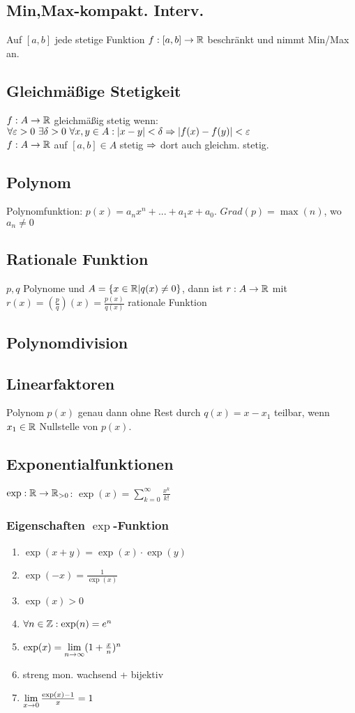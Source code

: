 \subsection*{Min,Max-kompakt. Interv.}
Auf $[a, b]$ jede stetige Funktion $f: [a, b] \rightarrow \mathbb R$ beschränkt und nimmt Min/Max an.
\subsection*{Gleichmäßige Stetigkeit}
$f: A \rightarrow \mathbb R$ gleichmäßig stetig wenn: $\forall \varepsilon > 0 \ \exists \delta > 0 \ \forall x, y \in A: |x - y| < \delta \Rightarrow |f(x) - f(y)| < \varepsilon$\\
$f: A \rightarrow \mathbb R$ auf $[a, b] \in A$ stetig $\Rightarrow$ dort auch gleichm. stetig.
\subsection*{Polynom}
Polynomfunktion: $p(x) = a_n x^n + ... + a_1 x + a_0$. $Grad(p) = \max(n)$, wo $a_n \neq 0$
\subsection*{Rationale Funktion}
$p, q$ Polynome und $A = \{x \in \mathbb R| q(x) \neq 0\}$, dann ist $r: A \rightarrow \mathbb R$ mit $r(x) = \left(\frac{p}{q}\right)(x) = \frac{p(x)}{q(x)}$ rationale Funktion
\subsection*{Polynomdivision}
\subsection*{Linearfaktoren}
Polynom $p(x)$ genau dann ohne Rest durch $q(x) = x - x_1$ teilbar, wenn $x_1 \in \mathbb R$ Nullstelle von $p(x)$.
\subsection*{Exponentialfunktionen}
$\exp: \mathbb R \rightarrow \mathbb R_{> 0}$: $\exp(x) = \sum\limits_{k = 0}^{\infty} \frac{x^k}{k!}$
\subsubsection*{Eigenschaften \texorpdfstring{$\exp$}{Exponential}-Funktion}
\begin{enumerate}[label=\alph*., noitemsep]
    \item $\exp(x + y) = \exp(x) \cdot \exp(y)$
    \item $\exp(-x) = \frac{1}{\exp(x)}$
    \item $\exp(x) > 0$
    \item $\forall n \in \mathbb Z: \exp(n) = e^n$
    \item $\exp(x) = \lim\limits_{n \rightarrow \infty} (1 + \frac{x}{n})^n$
    \item streng mon. wachsend + bijektiv
    \item $\lim\limits_{x \rightarrow 0} \frac{\exp(x) - 1}{x} = 1$
\end{enumerate}
